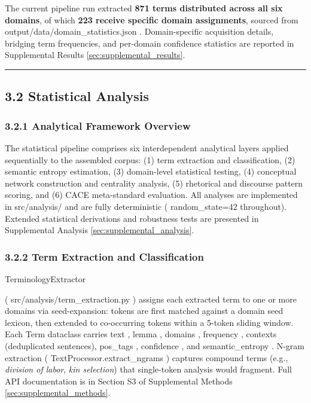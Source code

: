 \documentclass[
]{article}
\numberwithin{equation}{section}
\renewcommand{\texttt}[1]{%
    \colorbox{codebg}{\color{codefg}\ttfamily #1}%
}
\begin{document}
The current pipeline run extracted \textbf{871 terms distributed across
all six domains}, of which \textbf{223 receive specific domain
assignments}, sourced from \texttt{output/data/domain\_statistics.json}.
Domain-specific acquisition details, bridging term frequencies, and
per-domain confidence statistics are reported in Supplemental Results
\ref{sec:supplemental_results}.

\begin{center}\rule{0.5\linewidth}{0.5pt}\end{center}

\subsection{3.2 Statistical Analysis}\label{sec:statistical_analysis}

\subsubsection{3.2.1 Analytical Framework
Overview}\label{analytical-framework-overview}

The statistical pipeline comprises six interdependent analytical layers
applied sequentially to the assembled corpus: (1) term extraction and
classification, (2) semantic entropy estimation, (3) domain-level
statistical testing, (4) conceptual network construction and centrality
analysis, (5) rhetorical and discourse pattern scoring, and (6) CACE
meta-standard evaluation. All analyses are implemented in
\texttt{src/analysis/} and are fully deterministic
(\texttt{random\_state=42} throughout). Extended statistical derivations
and robustness tests are presented in Supplemental Analysis
\ref{sec:supplemental_analysis}.

\subsubsection{3.2.2 Term Extraction and
Classification}\label{term-extraction-and-classification}

\texttt{TerminologyExtractor}
(\texttt{src/analysis/term\_extraction.py}) assigns each extracted term
to one or more domains via seed-expansion: tokens are first matched
against a domain seed lexicon, then extended to co-occurring tokens
within a 5-token sliding window. Each \texttt{Term} dataclass carries
\texttt{text}, \texttt{lemma}, \texttt{domains}, \texttt{frequency},
\texttt{contexts} (deduplicated sentences), \texttt{pos\_tags},
\texttt{confidence}, and \texttt{semantic\_entropy}. N-gram extraction
(\texttt{TextProcessor.extract\_ngrams}) captures compound terms (e.g.,
\emph{division of labor}, \emph{kin selection}) that single-token
analysis would fragment. Full API documentation is in Section S3 of
Supplemental Methods \ref{sec:supplemental_methods}.
\end{document}
